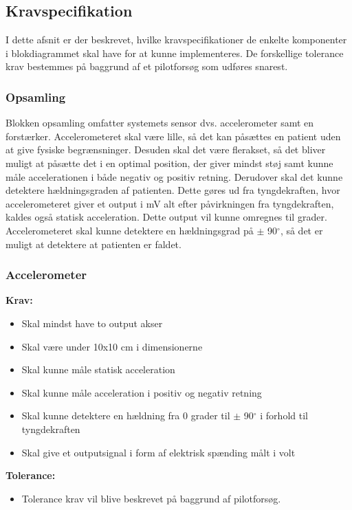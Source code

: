 \subsection{Kravspecifikation}
I dette afsnit er der beskrevet, hvilke kravspecifikationer de enkelte komponenter i blokdiagrammet skal have for at kunne implementeres. De forskellige tolerance krav bestemmes på baggrund af et pilotforsøg som udføres snarest.

\subsubsection{Opsamling}
Blokken opsamling omfatter systemets sensor dvs. accelerometer samt en forstærker. Accelerometeret skal være lille, så det kan påsættes en patient uden at give fysiske begrænsninger. Desuden skal det være flerakset, så det bliver muligt at påsætte det i en optimal position, der giver mindst støj samt kunne måle accelerationen i både negativ og positiv retning. Derudover skal det kunne detektere hældningsgraden af patienten. Dette gøres ud fra tyngdekraften, hvor accelerometeret giver et output i mV alt efter påvirkningen fra tyngdekraften, kaldes også statisk acceleration. Dette output vil kunne omregnes til grader. Accelerometeret skal kunne detektere en hældningsgrad på $\pm$ 90$^{\circ}$, så det er muligt at detektere at patienten er faldet. 
\newpage

\subsubsection{Accelerometer}
\textbf{Krav:}
\begin{itemize}
\item Skal mindst have to output akser
\item Skal være under 10x10 cm i dimensionerne
\item Skal kunne måle statisk acceleration
\item Skal kunne måle acceleration i positiv og negativ retning
\item Skal kunne detektere en hældning fra 0 grader til $\pm$ 90$^{\circ}$ i forhold til tyngdekraften
\item Skal give et outputsignal  i form af elektrisk spænding målt i volt
\end{itemize}
\textbf{Tolerance:}
\begin{itemize}
\item Tolerance krav vil blive beskrevet på baggrund af pilotforsøg.
\end{itemize}

